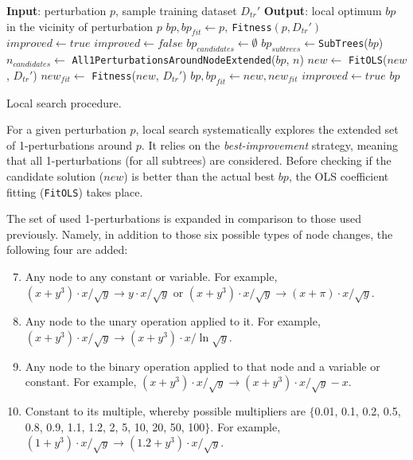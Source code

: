 \documentclass{bmcart}
\begin{document}
\begin{algorithm}
 
	\begin{algorithmic}[1] 
		\Statex \textbf{Input}: perturbation $p$, sample training dataset $D_{tr}'$   
		\Statex \textbf{Output}: local optimum $bp$ in the vicinity of perturbation $p$
		\State $bp, bp_{fit} \gets p,\ $\texttt{Fitness}$(p,D_{tr}')$ 
		\State $improved \gets true$
		\State $improved \gets false$
		\State $bp_{candidates} \gets \emptyset$
		\State $bp_{subtrees} \gets $\texttt{SubTrees}($bp$)
		\State $n_{candidates} \gets $ \texttt{All1PerturbationsAroundNodeExtended}($bp$, $n$)
		\State $new \gets$ \texttt{FitOLS}($new$, $D_{tr}'$)
		\State $new_{fit} \gets$ \texttt{Fitness}($new$, $D_{tr}'$)
		\State $bp, bp_{fit} \gets new, new_{fit}$
		\State $improved \gets true$
		\EndIf
		\EndFor
		\EndFor
		\EndWhile
		\State \Return $bp$
		\EndProcedure
	\end{algorithmic}
	\caption{Local search procedure.}
	\label{alg:ls}
\end{algorithm}  

For a given perturbation $p$, local search systematically explores the extended set of 1-perturbations around $p$. It relies on the \emph{best-improvement} strategy, meaning that all 1-perturbations (for all subtrees) are considered. Before checking if the candidate solution ($new$) is better than the actual best $bp$, the OLS coefficient fitting (\texttt{FitOLS}) takes place.  


The set of used 1-perturbations is expanded in comparison to those used previously. Namely, in addition to those six possible types of node changes, the following four are added:

\begin{enumerate}
	\setcounter{enumi}{6}
	\item Any node to any constant or variable. For example, $(x+y^3)\cdot x/\sqrt{y} \rightarrow y \cdot x / \sqrt{y}$ or  $(x+y^3)\cdot x/\sqrt{y} \rightarrow (x+\pi) \cdot x / \sqrt{y}$.
	\item Any node to the unary operation applied to it. For example, $(x+y^3)\cdot x/\sqrt{y} \rightarrow (x+y^3)\cdot x/\ln{\sqrt{y}}$.
	\item Any node to the binary operation applied to that node and a variable or constant. For example, $(x+y^3)\cdot x/\sqrt{y} \rightarrow (x+y^3)\cdot x/\sqrt{y} - x$.
	\item Constant to its multiple, whereby possible multipliers are $\{$0.01, 0.1, 0.2, 0.5, 0.8, 0.9, 1.1, 1.2, 2, 5, 10, 20, 50, 100$\}$. For example, $(1+y^3)\cdot x/\sqrt{y} \rightarrow (1.2+y^3)\cdot x/\sqrt{y}$.
\end{enumerate}
\end{document}
